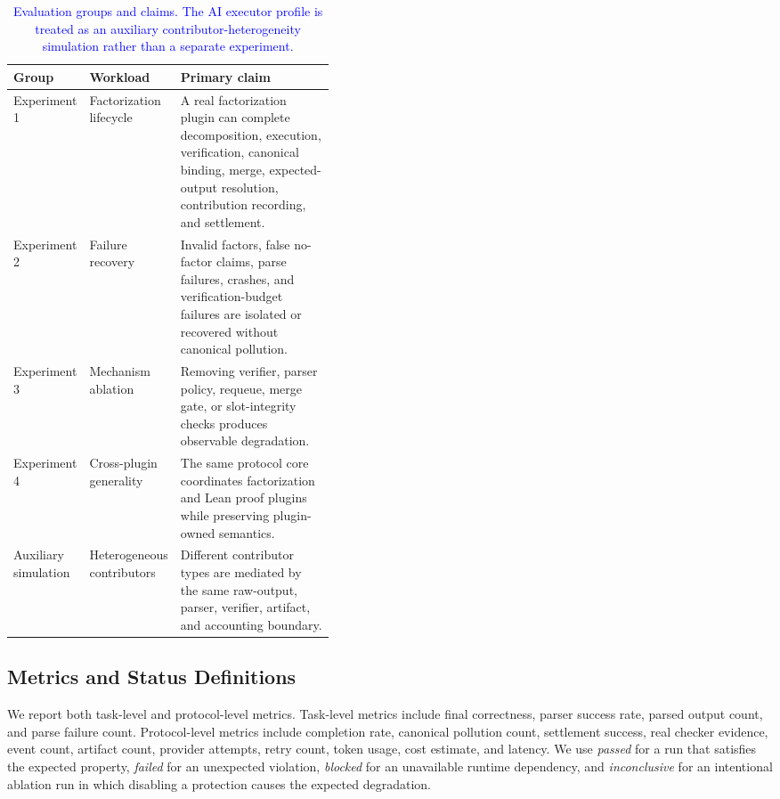 \documentclass{article}
\theoremstyle{plain}
\begin{document}
\begin{table}[!htbp]
\centering
\caption{\textcolor{blue}{Evaluation groups and claims. The AI executor profile is treated as an auxiliary contributor-heterogeneity simulation rather than a separate experiment.}}
\label{tab:evaluation-groups}
\small
{\color{blue}
\begin{tabularx}{\linewidth}{p{0.17\linewidth}p{0.25\linewidth}X}
\toprule
Group & Workload & Primary claim \\
\midrule
Experiment 1 & Factorization lifecycle
& A real factorization plugin can complete decomposition, execution,
verification, canonical binding, merge, expected-output resolution,
contribution recording, and settlement. \\
Experiment 2 & Failure recovery
& Invalid factors, false no-factor claims, parse failures, crashes, and
verification-budget failures are isolated or recovered without canonical
pollution. \\
Experiment 3 & Mechanism ablation
& Removing verifier, parser policy, requeue, merge gate, or slot-integrity
checks produces observable degradation. \\
Experiment 4 & Cross-plugin generality
& The same protocol core coordinates factorization and Lean proof plugins while
preserving plugin-owned semantics. \\
Auxiliary simulation & Heterogeneous contributors
& Different contributor types are mediated by the same raw-output, parser,
verifier, artifact, and accounting boundary. \\
\bottomrule
\end{tabularx}
}
\end{table}

\subsection{Metrics and Status Definitions}
\label{subsec:metrics-status}

We report both task-level and protocol-level metrics. Task-level metrics include
final correctness, parser success rate, parsed output count, and parse failure
count. Protocol-level metrics include completion rate, canonical pollution count,
settlement success, real checker evidence, event count, artifact count, provider
attempts, retry count, token usage, cost estimate, and latency. We use
\emph{passed} for a run that satisfies the expected property, \emph{failed} for
an unexpected violation, \emph{blocked} for an unavailable runtime dependency,
and \emph{inconclusive} for an intentional ablation run in which disabling a
protection causes the expected degradation.
\end{document}
